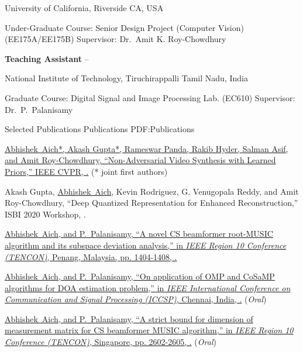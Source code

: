 \documentclass[letterpaper,MMMyyyy,nonstopmode]{simpleresumecv}
\begin{document}
\begin{Body}
\Gap
\BulletItem
University of California, Riverside
\hfill
CA, USA
\begin{Detail}
\SubBulletItem
Under-Graduate Course: 
Senior Design Project (Computer Vision) (EE175A/EE175B)
\SubBulletItem
Supervisor:
Dr.~Amit K. Roy-Chowdhury   
\end{Detail}

\Entry
{\textbf{Teaching Assistant}}
\hfill
{} --

\Gap
\BulletItem
National Institute of Technology, Tiruchirappalli
\hfill
Tamil Nadu, India
\begin{Detail}
\SubBulletItem
Graduate Course: 
Digital Signal and Image Processing Lab. (EC610)
\SubBulletItem
Supervisor:
Dr.~P.~Palanisamy   
\end{Detail}


\Section
{Selected Publications}
{Publications}
{PDF:Publications}

\begingroup
\renewcommand{\MaxNumberedItem}{[88]}
\NumberedItem{[1]}
\href{https://arxiv.org/abs/2003.09565}
{\underline{Abhishek~Aich}*, Akash Gupta*, Rameswar Panda, Rakib Hyder, Salman Asif, and Amit Roy-Chowdhury,
``Non-Adversarial Video Synthesis with Learned Priors,''
IEEE CVPR, 
.} (* joint first authors)

\Gap
\NumberedItem{[2]}
Akash Gupta, \underline{Abhishek~Aich}, Kevin Rodriguez, G. Venugopala Reddy, and Amit Roy-Chowdhury,
``Deep Quantized Representation for Enhanced Reconstruction,''
ISBI 2020 Workshop, 
. 

\Gap
\NumberedItem{[3]}
\href{https://ieeexplore.ieee.org/document/8228078}
{\underline{Abhishek~Aich}, and P.~Palanisamy,
``A novel CS beamformer root-MUSIC algorithm and its subspace deviation analysis,''
in \textit{IEEE Region 10 Conference (TENCON)},
Penang, Malaysia, pp. 1404-1408,
.}

\Gap
\NumberedItem{[4]}
\href{https://ieeexplore.ieee.org/document/8286749}
{\underline{Abhishek~Aich}, and P.~Palanisamy,
``On application of OMP and CoSaMP algorithms for DOA estimation problem,''
in \textit{IEEE International Conference on Communication and Signal Processing (ICCSP)},
Chennai, India, 
.} (\textit{Oral})

\Gap
\NumberedItem{[5]}
\href{https://ieeexplore.ieee.org/document/7848508}
{\underline{Abhishek~Aich}, and P.~Palanisamy,
``A strict bound for dimension of measurement matrix for CS beamformer MUSIC algorithm,''
in \textit{IEEE Region 10 Conference (TENCON)},
Singapore, pp. 2602-2605,
.} (\textit{Oral})


\end{Body}
\end{document}
